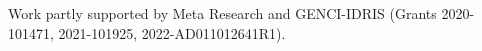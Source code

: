 \begin{acks}
Work partly supported by Meta Research and GENCI-IDRIS (Grants 2020-101471, 2021-101925, 2022-AD011012641R1).
\end{acks}

